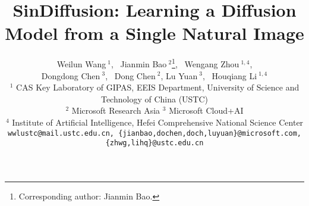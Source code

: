 \documentclass[10pt,twocolumn,letterpaper]{article}
\begin{document}
\title{\vspace{-16mm}SinDiffusion: Learning a Diffusion Model from a Single Natural Image \vspace{-6mm}}

\author{Weilun Wang{\small $~^{1}$}, ~Jianmin Bao{\small $~^{2}$}\thanks{Corresponding author: Jianmin Bao.}, ~Wengang Zhou{\small $~^{1,4}$}, \\
Dongdong Chen{\small $~^{3}$}, ~Dong Chen{\small $~^{2}$}, Lu Yuan{\small $~^{3}$}, ~Houqiang Li{\small $~^{1,4}$}\\
\normalsize
$^{1}$ CAS Key Laboratory of GIPAS, EEIS Department, University of Science and Technology of China (USTC) \\
\normalsize
$^{2}$ Microsoft Research Asia \enspace \enspace \enspace $^{3}$ Microsoft Cloud+AI\\
\normalsize
$^{4}$ Institute of Artificial Intelligence, Hefei Comprehensive National Science Center\\
\normalsize
{\tt\small wwlustc@mail.ustc.edu.cn, \{jianbao,dochen,doch,luyuan\}@microsoft.com, \{zhwg,lihq\}@ustc.edu.cn}
}

\end{document}

